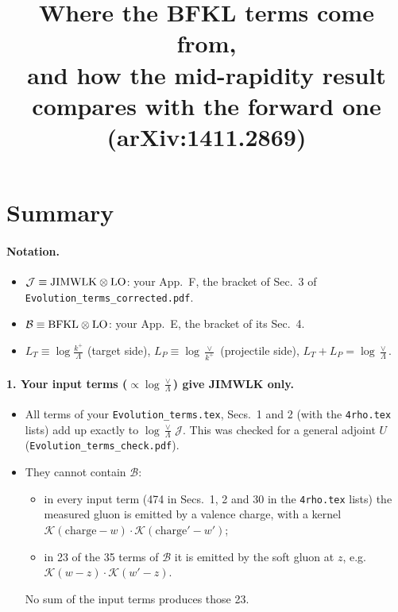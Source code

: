 \documentclass[11pt]{article}
\title{Where the BFKL terms come from,\\ and how the mid-rapidity result compares with the forward one (arXiv:1411.2869)}
\date{}
\numberwithin{equation}{section}
\newcommand{\JJ}{\mathcal J}
\newcommand{\BB}{\mathcal B}
\newcommand{\LT}{L_T}
\newcommand{\LP}{L_P}
\begin{document}
\maketitle
\tableofcontents

\section{Summary}\label{sec:summary}
\paragraph{Notation.}
\begin{itemize}
\item $\JJ\equiv{\rm JIMWLK}\otimes{\rm LO}$: your App.~F, the bracket of Sec.~3 of \texttt{Evolution\_terms\_corrected.pdf}.
\item $\BB\equiv{\rm BFKL}\otimes{\rm LO}$: your App.~E, the bracket of its Sec.~4.
\item $\LT\equiv\log\frac{k^+}{\Lambda}$ (target side), $\LP\equiv\log\frac{\vee}{k^+}$ (projectile side), $\LT+\LP=\log\frac\vee\Lambda$.
\end{itemize}

\paragraph{1. Your input terms ($\propto\log\frac\vee\Lambda$) give JIMWLK only.}
\begin{itemize}
\item All terms of your \texttt{Evolution\_terms.tex}, Secs.~1 and 2 (with the \texttt{4rho.tex} lists) add up exactly to $\log\frac{\vee}{\Lambda}\,\JJ$. This was checked for a general adjoint $U$ (\texttt{Evolution\_terms\_check.pdf}).
\item They cannot contain $\BB$:
\begin{itemize}
\item in every input term (474 in Secs.~1, 2 and 30 in the \texttt{4rho.tex} lists) the measured gluon is emitted by a valence charge, with a kernel $\mathcal K(\text{charge}-w)\cdot\mathcal K(\text{charge}'-w')$;
\item in 23 of the 35 terms of $\BB$ it is emitted by the soft gluon at $z$, e.g.\ $\mathcal K(w-z)\cdot\mathcal K(w'-z)$.
\end{itemize}
No sum of the input terms produces those 23.
\end{itemize}
\end{document}
